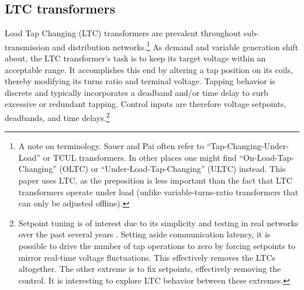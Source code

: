 \documentclass[10pt,letterpaper]{article}
\begin{document}
\subsection{LTC transformers}
\label{sec:ltcs}
Load Tap Changing (LTC) transformers are prevalent throughout sub-transmission and distribution networks.\footnote{A note on terminology. Sauer and Pai often refer to ``Tap-Changing-Under-Load'' or TCUL transformers. In other places one might find ``On-Load-Tap-Changing'' (OLTC) or ``Under-Load-Tap-Changing'' (ULTC) instead. This paper uses LTC, as the preposition is less important than the fact that LTC transformers operate under load (unlike variable-turns-ratio transformers that can only be adjusted offline).} As demand and variable generation shift about, the LTC transformer's task is to keep its target voltage within an acceptable range. It accomplishes this end by altering a tap position on its coils, thereby modifying its turns ratio and terminal voltage. Tapping behavior is discrete and typically incorporates a deadband and/or time delay to curb excessive or redundant tapping. Control inputs are therefore voltage setpoints, deadbands, and time delays.\footnote{Setpoint tuning is of interest due to its simplicity and testing in real networks over the past several years \cite{li2008,stifter2012}. Setting aside communication latency, it is possible to drive the number of tap operations to zero by forcing setpoints to mirror real-time voltage fluctuations. This effectively removes the LTCs altogether. The other extreme is to fix setpoints, effectively removing the control. It is interesting to explore LTC behavior between these extremes.}
\end{document}
